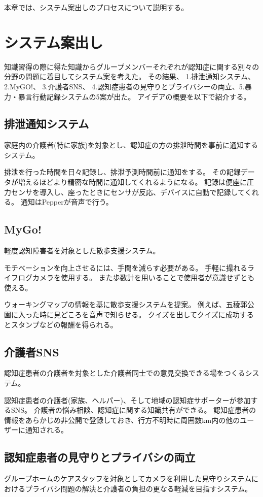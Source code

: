 \documentclass[../report]{subfiles}
\begin{document}
本章では、システム案出しのプロセスについて説明する。

\section{システム案出し}
知識習得の際に得た知識からグループメンバーそれぞれが認知症に関する別々の分野の問題に着目してシステム案を考えた。
その結果、 1.排泄通知システム、 2.MyGO!、 3.介護者SNS、 4.認知症患者の見守りとプライバシーの両立、5.暴力・暴言行動記録システムの5案が出た。
アイデアの概要を以下で紹介する。

\subsection{排泄通知システム}
家庭内の介護者(特に家族)を対象とし、認知症の方の排泄時間を事前に通知するシステム。

排泄を行った時間を日々記録し、排泄予測時間前に通知をする。
その記録データが増えるほどより精密な時間に通知してくれるようになる。
記録は便座に圧力センサを導入し、座ったときにセンサが反応、デバイスに自動で記録してくれる。
通知はPepperが音声で行う。

\subsection{MyGo!}
軽度認知障害者を対象とした散歩支援システム。

モチベーションを向上させるには、手間を減らす必要がある。
手軽に撮れるライフログカメラを使用する。
また歩数計を用いることで使用者が意識せずとも使える。

ウォーキングマップの情報を基に散歩支援システムを提案。
例えば、五稜郭公園に入った時に見どころを音声で知らせる。
クイズを出してクイズに成功するとスタンプなどの報酬を得られる。

\subsection{介護者SNS}
認知症患者の介護者を対象とした介護者同士での意見交換できる場をつくるシステム。

認知症患者の介護者(家族、ヘルパー)、そして地域の認知症サポーターが参加するSNS。
介護者の悩み相談、認知症に関する知識共有ができる。
認知症患者の情報をあらかじめ非公開で登録しておき、行方不明時に周囲数km内の他のユーザーに通知される。

\subsection{認知症患者の見守りとプライバシの両立}
グループホームのケアスタッフを対象としてカメラを利用した見守りシステムにおけるプライバシ問題の解決と介護者の負担の更なる軽減を目指すシステム。
\end{document}
